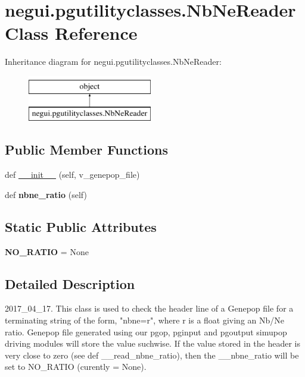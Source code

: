 \hypertarget{classnegui_1_1pgutilityclasses_1_1NbNeReader}{}\section{negui.\+pgutilityclasses.\+Nb\+Ne\+Reader Class Reference}
\label{classnegui_1_1pgutilityclasses_1_1NbNeReader}
Inheritance diagram for negui.\+pgutilityclasses.\+Nb\+Ne\+Reader\+:\begin{figure}[H]
\begin{center}
\leavevmode
\includegraphics[height=2.000000cm]{classnegui_1_1pgutilityclasses_1_1NbNeReader}
\end{center}
\end{figure}
\subsection*{Public Member Functions}
\begin{DoxyCompactItemize}
\item 
def \hyperlink{classnegui_1_1pgutilityclasses_1_1NbNeReader_ad4dbe99a948ee4133ced448874060e94}{\+\_\+\+\_\+init\+\_\+\+\_\+} (self, v\+\_\+genepop\+\_\+file)
\item 
def {\bfseries nbne\+\_\+ratio} (self)\hypertarget{classnegui_1_1pgutilityclasses_1_1NbNeReader_a353d1b38373b5ba51e72cff5d605b032}{}\label{classnegui_1_1pgutilityclasses_1_1NbNeReader_a353d1b38373b5ba51e72cff5d605b032}

\end{DoxyCompactItemize}
\subsection*{Static Public Attributes}
\begin{DoxyCompactItemize}
\item 
{\bfseries N\+O\+\_\+\+R\+A\+T\+IO} = None\hypertarget{classnegui_1_1pgutilityclasses_1_1NbNeReader_a56d113bf03742b060487869f004f5d60}{}\label{classnegui_1_1pgutilityclasses_1_1NbNeReader_a56d113bf03742b060487869f004f5d60}

\end{DoxyCompactItemize}


\subsection{Detailed Description}
\begin{DoxyVerb}2017_04_17.  This class is used to check the header line of a
Genepop file for a terminating string of the form, "nbne=r", where
r is a float giving an Nb/Ne ratio.  Genepop file generated using our
pgop, pginput and pgoutput simupop driving modules will store the 
value suchwise.  If the value stored in the header is very close
to zero (see def __read_nbne_ratio), then the __nbne_ratio will
be set to NO_RATIO (curently = None).
\end{DoxyVerb}
 

